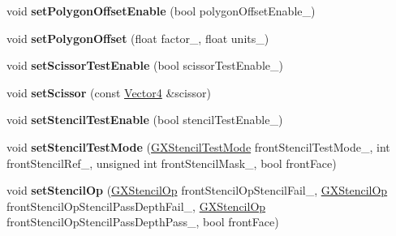 \begin{DoxyCompactItemize}
\item 
void {\bfseries set\+Polygon\+Offset\+Enable} (bool polygon\+Offset\+Enable\+\_\+)\hypertarget{class_i_dream_sky_1_1_material_1_1_state_block_aac7cb040eb05f43de05e6f61b34158bb}{}\label{class_i_dream_sky_1_1_material_1_1_state_block_aac7cb040eb05f43de05e6f61b34158bb}

\item 
void {\bfseries set\+Polygon\+Offset} (float factor\+\_\+, float units\+\_\+)\hypertarget{class_i_dream_sky_1_1_material_1_1_state_block_ac066f10f0657131bc0edc1eea280c42b}{}\label{class_i_dream_sky_1_1_material_1_1_state_block_ac066f10f0657131bc0edc1eea280c42b}

\item 
void {\bfseries set\+Scissor\+Test\+Enable} (bool scissor\+Test\+Enable\+\_\+)\hypertarget{class_i_dream_sky_1_1_material_1_1_state_block_a558e666577bf509ff111c4623db95c33}{}\label{class_i_dream_sky_1_1_material_1_1_state_block_a558e666577bf509ff111c4623db95c33}

\item 
void {\bfseries set\+Scissor} (const \hyperlink{class_i_dream_sky_1_1_vector4}{Vector4} \&scissor)\hypertarget{class_i_dream_sky_1_1_material_1_1_state_block_a2901263609a695e3cb352b2b3a27db54}{}\label{class_i_dream_sky_1_1_material_1_1_state_block_a2901263609a695e3cb352b2b3a27db54}

\item 
void {\bfseries set\+Stencil\+Test\+Enable} (bool stencil\+Test\+Enable\+\_\+)\hypertarget{class_i_dream_sky_1_1_material_1_1_state_block_a39117ec86330f6543e3d78592cae5023}{}\label{class_i_dream_sky_1_1_material_1_1_state_block_a39117ec86330f6543e3d78592cae5023}

\item 
void {\bfseries set\+Stencil\+Test\+Mode} (\hyperlink{class_i_dream_sky_1_1_g_x_stencil_test_mode}{G\+X\+Stencil\+Test\+Mode} front\+Stencil\+Test\+Mode\+\_\+, int front\+Stencil\+Ref\+\_\+, unsigned int front\+Stencil\+Mask\+\_\+, bool front\+Face)\hypertarget{class_i_dream_sky_1_1_material_1_1_state_block_a74a6cc127b6d7b2b0ce2a0a47ee8ad61}{}\label{class_i_dream_sky_1_1_material_1_1_state_block_a74a6cc127b6d7b2b0ce2a0a47ee8ad61}

\item 
void {\bfseries set\+Stencil\+Op} (\hyperlink{class_i_dream_sky_1_1_g_x_stencil_op}{G\+X\+Stencil\+Op} front\+Stencil\+Op\+Stencil\+Fail\+\_\+, \hyperlink{class_i_dream_sky_1_1_g_x_stencil_op}{G\+X\+Stencil\+Op} front\+Stencil\+Op\+Stencil\+Pass\+Depth\+Fail\+\_\+, \hyperlink{class_i_dream_sky_1_1_g_x_stencil_op}{G\+X\+Stencil\+Op} front\+Stencil\+Op\+Stencil\+Pass\+Depth\+Pass\+\_\+, bool front\+Face)\hypertarget{class_i_dream_sky_1_1_material_1_1_state_block_ac85e3b278ddba391fcfb9edc82190d1b}{}\label{class_i_dream_sky_1_1_material_1_1_state_block_ac85e3b278ddba391fcfb9edc82190d1b}


\end{DoxyCompactItemize}
